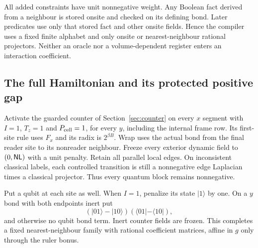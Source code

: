 All added constraints have unit nonnegative weight. Any Boolean fact
derived from a neighbour is stored onsite and checked on its defining
bond. Later predicates use only that stored fact and other onsite
fields. Hence the compiler uses a fixed finite alphabet and only
onsite or nearest-neighbour rational projectors. Neither an oracle
nor a volume-dependent register enters an interaction coefficient.

\subsection{The full Hamiltonian and its protected positive gap}
Activate the guarded counter of Section~\ref{sec:counter} on every
$x$ segment with $I=1$, $T_z=1$ and $P_{\rm cell}=1$, for every
$y$, including the internal frame row. Its first-site rule uses
$F_x$ and its radix is $2^{\beta B}$. Wrap uses the actual bond from
the final reader site to its nonreader neighbour. Freeze every
exterior dynamic field to $(0,\mathsf{NL})$ with a unit penalty. Retain all
parallel local edges. On inconsistent classical labels, each
controlled transition is still a nonnegative edge Laplacian times
a classical projector. Thus every quantum block remains nonnegative.

Put a qubit at each site as well. When $I=1$, penalize its state
$|1\rangle$ by one. On a $y$ bond with both endpoints inert put
\[
 (|01\rangle-|10\rangle)(\langle01|-\langle10|),
\]
and otherwise no qubit bond term. Inert counter fields are frozen.
This completes a fixed nearest-neighbour family with rational
coefficient matrices, affine in $g$ only through the ruler bonus.

